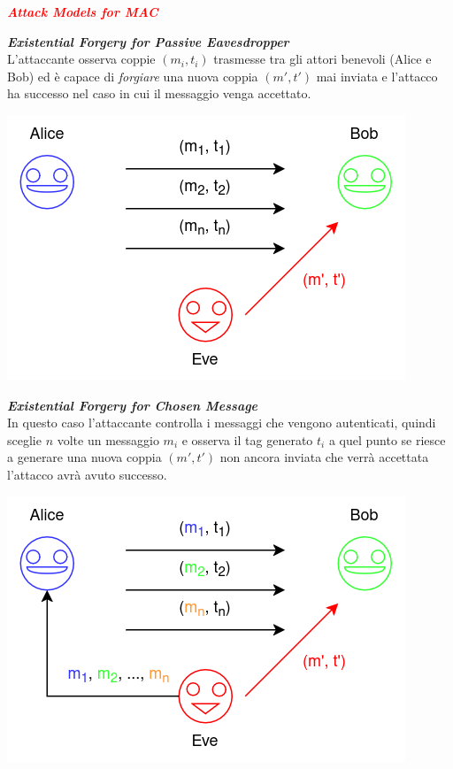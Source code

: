 \begin{flushleft}
    \textcolor{red}{\textbf{\textit{Attack Models for MAC}}}

    \medskip

    \begin{minipage}[c]{0.45\textwidth}
        \centering
        \textbf{\textit{Existential Forgery for Passive Eavesdropper}} \\
        L'attaccante osserva coppie $(m_i, t_i)$ trasmesse tra gli attori benevoli (Alice e Bob) ed è capace di \textit{forgiare} una nuova coppia $(m', t')$ mai inviata e l'attacco ha successo nel caso in cui il messaggio venga accettato.

        \smallskip

        \includegraphics[width=\textwidth]{img/mac_am_1.png}
    \end{minipage}
    \hfill
    \begin{minipage}[c]{0.45\textwidth}
        \centering
        \textbf{\textit{Existential Forgery for Chosen Message}} \\
        In questo caso l'attaccante controlla i messaggi che vengono autenticati, quindi sceglie $n$ volte un messaggio $m_i$ e osserva il tag generato $t_i$ a quel punto se riesce a generare una nuova coppia $(m', t')$ non ancora inviata che verrà accettata l'attacco avrà avuto successo.

        \smallskip

        \includegraphics[width=\textwidth]{img/mac_am_2.png}
    \end{minipage}


\end{flushleft}
